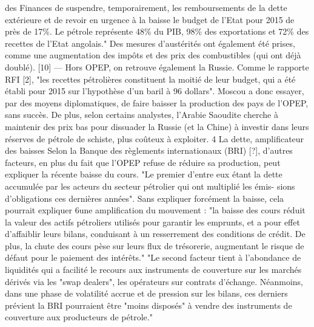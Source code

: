 des Finances de suspendre, temporairement, les remboursements de la dette extérieure et
de revoir en urgence à la baisse le budget de l’Etat pour 2015 de près de 17\%. Le pétrole
représente 48\% du PIB, 98\% des exportations et 72\% des recettes de l’Etat angolais." Des
mesures d’austérités ont également été prises, comme une augmentation des impôts et des
prix des combustibles (qui ont déjà doublé). [10]
— Hors OPEP, on retrouve également la Russie. Comme le rapporte RFI [2], "les recettes
pétrolières constituent la moitié de leur budget, qui a été établi pour 2015 sur l’hypothèse
d’un baril à 96 dollars". Moscou a donc essayer, par des moyens diplomatiques, de faire
baisser la production des pays de l’OPEP, sans succès. De plus, selon certains analystes,
l’Arabie Saoudite cherche à maintenir des prix bas pour dissuader la Russie (et la Chine) à
investir dans leurs réserves de pétrole de schiste, plus coûteux à exploiter.
4
La dette, amplificateur des baisses
Selon la Banque des règlements internationaux (BRI) [?], d’autres facteurs, en plus du fait que
l’OPEP refuse de réduire sa production, peut expliquer la récente baisse du cours. "Le premier
d’entre eux étant la dette accumulée par les acteurs du secteur pétrolier qui ont multiplié les émis-
sions d’obligations ces dernières années". Sans expliquer forcément la baisse, cela pourrait expliquer
6une amplification du mouvement : "la baisse des cours réduit la valeur des actifs pétroliers utilisés
pour garantir les emprunts, et a pour effet d’affaiblir leurs bilans, conduisant à un resserrement
des conditions de crédit. De plus, la chute des cours pèse sur leurs flux de trésorerie, augmentant
le risque de défaut pour le paiement des intérêts."
"Le second facteur tient à l’abondance de liquidités qui a facilité le recours aux instruments de
couverture sur les marchés dérivés via les "swap dealers", les opérateurs sur contrats d’échange.
Néanmoins, dans une phase de volatilité accrue et de pression sur les bilans, ces derniers prévient
la BRI pourraient être "moins disposés" à vendre des instruments de couverture aux producteurs
de pétrole."
